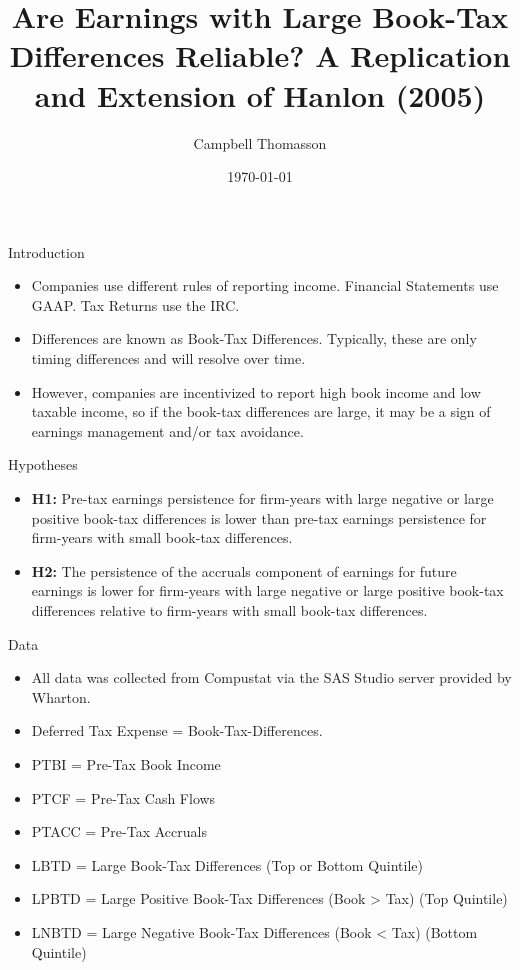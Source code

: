 \documentclass{beamer}
\title{Are Earnings with Large Book-Tax Differences Reliable? A Replication and Extension of Hanlon (2005)}
\author{Campbell Thomasson}
\date{\today}
\begin{document}
\begin{frame}
  \titlepage
\end{frame}

\begin{frame}{Introduction}
\begin{itemize}
    \item  Companies use different rules of reporting income. Financial Statements use GAAP. Tax Returns use the IRC.
    \item  Differences are known as Book-Tax Differences. Typically, these are only timing differences and will resolve over time.  
    \item  However, companies are incentivized to report high book income and low taxable income, so if the book-tax differences are large, it may be a sign of earnings management and/or tax avoidance.
\end{itemize}
\end{frame}

\begin{frame}{Hypotheses}
\begin{itemize}
    \item \textbf{H1:} Pre-tax earnings persistence for firm-years with large negative or large positive book-tax differences is lower than pre-tax earnings persistence for firm-years with small book-tax differences.
    \item  \textbf{H2:} The persistence of the accruals component of earnings for future earnings is lower for firm-years with large negative or large positive book-tax differences relative to firm-years with small book-tax differences.
\end{itemize}
\end{frame}

\begin{frame}{Data}
\begin{itemize}
    \item  All data was collected from Compustat via the SAS Studio server provided by Wharton.
    \item  Deferred Tax Expense = Book-Tax-Differences. 
    \item  PTBI = Pre-Tax Book Income
    \item  PTCF = Pre-Tax Cash Flows
    \item  PTACC = Pre-Tax Accruals
    \item  LBTD = Large Book-Tax Differences (Top or Bottom Quintile)
    \item  LPBTD = Large Positive Book-Tax Differences (Book > Tax) (Top Quintile)
    \item  LNBTD = Large Negative Book-Tax Differences (Book < Tax) (Bottom Quintile)
\end{itemize}
\end{frame}
\end{document}
